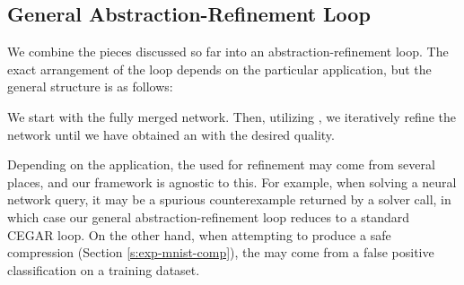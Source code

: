\subsection{General Abstraction-Refinement Loop}
\label{s:abs-ref-fw}

We combine the pieces discussed so far into an abstraction-refinement loop. The
exact arrangement of the loop depends on the particular application, but the
general structure is as follows:

We start with the fully merged network. Then, utilizing \gencex, we iteratively
refine the network until we have obtained an \abs with the desired quality.

Depending on the application, the \gencex used for refinement may come from
several places, and our framework is agnostic to this. For example, when solving
a neural network query, it may be a spurious counterexample returned by a solver
call, in which case our general abstraction-refinement loop reduces to a
standard CEGAR loop. On the other hand, when attempting to produce a safe
compression (Section \ref{s:exp-mnist-comp}), the \gencex may come from a false
positive classification on a training dataset.

